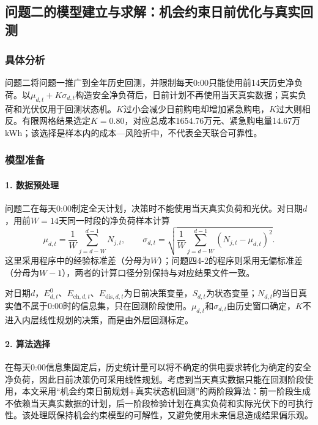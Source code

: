 \documentclass{cumcmthesis}
\begin{document}
\subsection{问题二的模型建立与求解：机会约束日前优化与真实回测}

\subsubsection{具体分析}

问题二将问题一推广到全年历史回测，并限制每天0:00只能使用前14天历史净负荷。以$\mu_{d,t}+K\sigma_{d,t}$构造安全净负荷后，日前计划不再使用当天真实数据；真实负荷和光伏仅用于回测状态机。$K$过小会减少日前购电却增加紧急购电，$K$过大则相反。有限网格结果选定$K=0.80$，对应总成本1654.76万元、紧急购电量14.67万kWh；该选择是样本内的成本—风险折中，不代表全天联合可靠性。

\subsubsection{模型准备}

\paragraph{1. 数据预处理}

问题二在每天0:00制定全天计划，决策时不能使用当天真实负荷和光伏。对日期$d$，用前$W=14$天同一时段的净负荷样本计算
\begin{equation}
\mu_{d,t}=\frac{1}{W}\sum_{j=d-W}^{d-1}N_{j,t},\qquad
\sigma_{d,t}=\sqrt{\frac{1}{W}\sum_{j=d-W}^{d-1}(N_{j,t}-\mu_{d,t})^2}.
\tag{10}
\end{equation}
这里采用程序中的经验标准差（分母为$W$）；问题四4-2的程序则采用无偏标准差（分母为$W-1$），两者的计算口径分别保持与对应结果文件一致。

对日期$d$，$E^0_{d,t}$、$E_{\mathrm{ch},d,t}$、$E_{\mathrm{dis},d,t}$为日前决策变量，$S_{d,t}$为状态变量；$N_{d,t}$的当日真实值不属于0:00时的信息集，只在回测阶段使用。$\mu_{d,t}$和$\sigma_{d,t}$由历史窗口确定，$K$不进入内层线性规划的决策，而是由外层回测标定。

\paragraph{2. 算法选择}

在每天0:00信息集固定后，历史统计量可以将不确定的供电要求转化为确定的安全净负荷，因此日前决策仍可采用线性规划。考虑到当天真实数据只能在回测阶段使用，本文采用“机会约束日前规划+真实状态机回测”的两阶段算法：前一阶段生成不依赖当天真实数据的计划，后一阶段检验计划在真实负荷和实际光伏下的可执行性。该处理既保持机会约束模型的可解性，又避免使用未来信息造成结果偏乐观。
\end{document}
